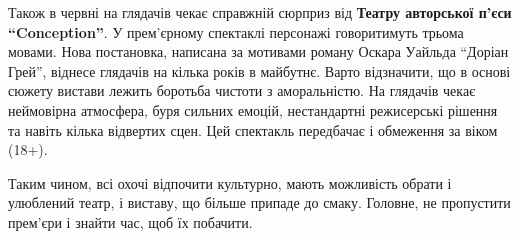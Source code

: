 Також в червні на глядачів чекає справжній сюрприз від \textbf{Театру авторської п'єси
\enquote{Conception}}. У прем'єрному спектаклі персонажі говоритимуть трьома мовами.
Нова постановка, написана за мотивами роману Оскара Уайльда \enquote{Доріан Грей},
віднесе глядачів на кілька років в майбутнє. Варто відзначити, що в основі
сюжету вистави лежить боротьба чистоти з аморальністю. На глядачів чекає
неймовірна атмосфера, буря сильних емоцій, нестандартні режисерські рішення та
навіть кілька відвертих сцен. Цей спектакль передбачає і обмеження за віком
(18+).

Таким чином, всі охочі відпочити культурно, мають можливість обрати і улюблений
театр, і виставу, що більше припаде до смаку. Головне, не пропустити прем'єри і
знайти час, щоб їх побачити.
